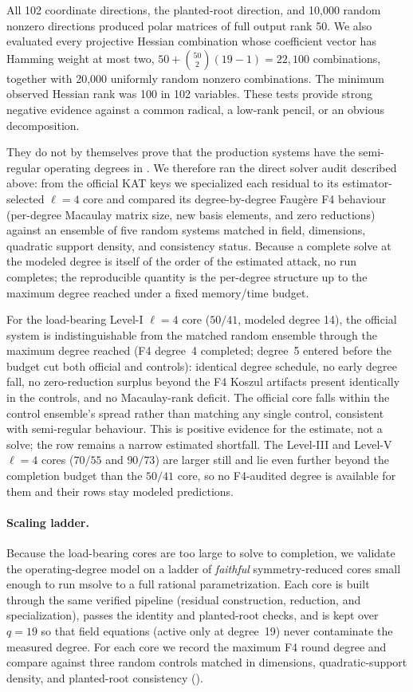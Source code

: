 \documentclass[11pt]{article}
\begin{document}
All 102 coordinate directions, the planted-root direction, and 10,000 random
nonzero directions produced polar matrices of full output rank 50.  We also
evaluated every projective Hessian combination whose coefficient vector has
Hamming weight at most two, $50+\binom{50}{2}(19-1)=22{,}100$ combinations,
together with 20,000 uniformly random nonzero combinations.  The minimum
observed Hessian rank was 100 in 102 variables.  These tests provide strong
negative evidence against a common radical, a low-rank pencil, or an obvious
decomposition.

They do not by themselves prove that the production systems have the semi-regular
operating degrees in .  We therefore ran the direct solver
audit described above: from the official KAT keys we specialized each residual to
its estimator-selected $\ell=4$ core and compared its degree-by-degree Faug\`ere
F4 behaviour (per-degree Macaulay matrix size, new basis elements, and zero
reductions) against an ensemble of five random systems matched in field,
dimensions, quadratic support density, and consistency status.  Because a
complete solve at the modeled degree is itself of the order of the estimated
attack, no run completes; the reproducible quantity is the per-degree structure
up to the maximum degree reached under a fixed memory/time budget.

For the load-bearing Level-I $\ell=4$ core ($50/41$, modeled degree 14), the
official system is indistinguishable from the matched random ensemble through the
maximum degree reached (F4 degree~4 completed; degree~5 entered before the budget
cut both official and controls): identical degree schedule, no early degree fall,
no zero-reduction surplus beyond the F4 Koszul artifacts present identically in
the controls, and no Macaulay-rank deficit.  The official core falls within the
control ensemble's spread rather than matching any single control, consistent
with semi-regular behaviour.  This is positive evidence for the estimate, not a
solve; the row remains a narrow estimated shortfall.  The Level-III and Level-V
$\ell=4$ cores ($70/55$ and $90/73$) are larger still and lie even further beyond
the completion budget than the $50/41$ core, so no F4-audited degree is available
for them and their rows stay modeled predictions.

\paragraph{Scaling ladder.}
Because the load-bearing cores are too large to solve to completion, we validate
the operating-degree model on a ladder of \emph{faithful} symmetry-reduced cores
small enough to run msolve to a full rational parametrization.  Each core is built
through the same verified pipeline (residual construction, reduction, and
specialization), passes the identity and planted-root checks, and is kept over
$q=19$ so that field equations (active only at degree~19) never contaminate the
measured degree.  For each core we record the maximum F4 round degree and compare
against three random controls matched in dimensions, quadratic-support density,
and planted-root consistency ().
\end{document}
